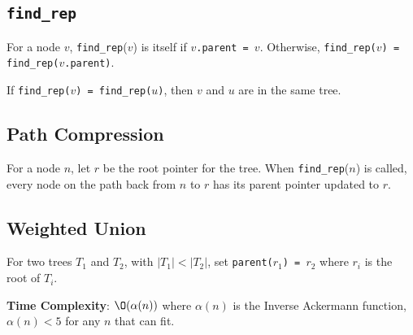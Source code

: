 \documentclass[12pt, letterpaper]{article}
\begin{document}
\begin{multicols*}{3}
            \subsection{\texttt{find\_rep}}
            For a node $v$, \texttt{find\_rep}($v$) is itself if $v$\texttt{.parent = $v$}.
            Otherwise, \texttt{find\_rep($v$) = find\_rep($v$.parent)}.

            If \texttt{find\_rep($v$) = find\_rep($u$)}, then $v$ and $u$ are in the same tree.
            
            \subsection{Path Compression}
            For a node $n$, let $r$ be the root pointer for the tree. When \texttt{find\_rep}($n$) is called, every node on the path back from $n$ to $r$ has its parent pointer updated to $r$.
            

            \subsection{Weighted Union}
            For two trees $T_1$ and $T_2$, with $|T_1| < |T_2|$, set \texttt{parent($r_1$) = $r_2$} where $r_i$ is the root of $T_i$.


            {\bf Time Complexity}: $\O(\alpha(n))$ where $\alpha(n)$ is the Inverse Ackermann function, $\alpha(n) < 5$ for any $n$ that can fit.
    \end{multicols*}
\end{document}
